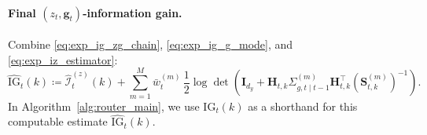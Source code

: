 \paragraph{Final \((z_t,\mathbf{g}_t)\)-information gain.}
Combine \eqref{eq:exp_ig_zg_chain}, \eqref{eq:exp_ig_g_mode}, and \eqref{eq:exp_iz_estimator}:
\begin{equation}
\label{eq:exp_ig_zg_final}
\widehat{\mathrm{IG}}_t(k)
\coloneqq
\widehat{\mathcal{I}}_t^{(z)}(k)
+
\sum_{m=1}^M \bar{w}_t^{(m)}\,
\frac12\log\det\!\left(\mathbf{I}_{d_y}+\mathbf{H}_{t,k}\Sigma^{(m)}_{g,t\mid t-1}\mathbf{H}_{t,k}^\top(\mathbf{S}^{(m)}_{t,k})^{-1}\right).
\end{equation}
In Algorithm~\ref{alg:router_main}, we use \(\mathrm{IG}_t(k)\) as a shorthand for this computable estimate \(\widehat{\mathrm{IG}}_t(k)\).

